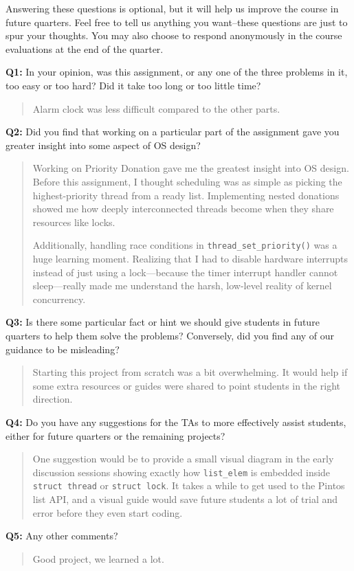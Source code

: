 \documentclass[a4paper,11pt]{paper}
\begin{document}
Answering these questions is optional, but it will help us improve the course in future quarters.  Feel free to tell us anything you want--these questions are just to spur your thoughts.  You may also choose to respond anonymously in the course evaluations at the end of the quarter.

\textbf{Q1:} In your opinion, was this assignment, or any one of the three
problems in it, too easy or too hard?  Did it take too long or too little time?

\begin{quote}
Alarm clock was less difficult compared to the other parts.
\end{quote}

\textbf{Q2:} Did you find that working on a particular part of the assignment
gave you greater insight into some aspect of OS design?

\begin{quote}
Working on Priority Donation gave me the greatest insight into OS design. Before this assignment, I thought scheduling was as simple as picking the highest-priority thread from a ready list. Implementing nested donations showed me how deeply interconnected threads become when they share resources like locks.

Additionally, handling race conditions in \texttt{thread\_set\_priority()} was a huge learning moment. Realizing that I had to disable hardware interrupts instead of just using a lock---because the timer interrupt handler cannot sleep---really made me understand the harsh, low-level reality of kernel concurrency.
\end{quote}

\textbf{Q3:} Is there some particular fact or hint we should give students in
future quarters to help them solve the problems?  Conversely, did you find any
of our guidance to be misleading?

\begin{quote}
Starting this project from scratch was a bit overwhelming. It would help 
if some extra resources or guides were shared to point students in the 
right direction.

\end{quote}

\textbf{Q4:} Do you have any suggestions for the TAs to more effectively assist
students, either for future quarters or the remaining projects?

\begin{quote}
One suggestion would be to provide a small visual diagram in the early discussion sessions showing exactly how \texttt{list\_elem} is embedded inside \texttt{struct thread} or \texttt{struct lock}. It takes a while to get used to the Pintos list API, and a visual guide would save future students a lot of trial and error before they even start coding.
\end{quote}

\textbf{Q5:} Any other comments?
\begin{quote}
Good project, we learned a lot.
\end{quote}
\end{document}
